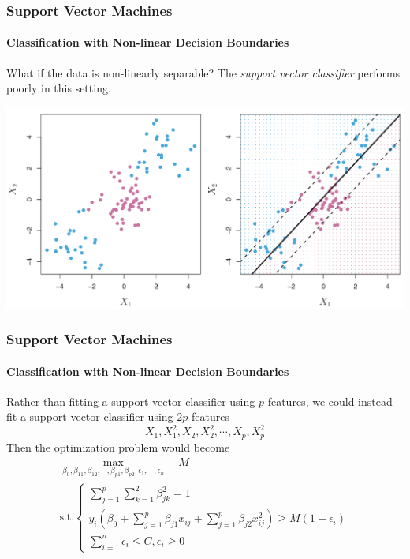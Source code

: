 \documentclass{beamer}
\begin{document}
\begin{frame}
    \frametitle{Support Vector Machines}
    \framesubtitle{Classification with Non-linear Decision Boundaries}
    What if the data is non-linearly separable? The \textit{support vector classifier} 
    performs poorly in this setting.
    \begin{center}
        \includegraphics[scale=0.2]{images/non-linear.png}
    \end{center}
\end{frame}

\begin{frame}
    \frametitle{Support Vector Machines}
    \framesubtitle{Classification with Non-linear Decision Boundaries}
    Rather than fitting a support vector classifier using $p$ features, 
    we could instead fit a support vector classifier using $2p$ features
    \[X_1,X_1^2,X_2,X_2^2,\cdots,X_p,X_p^2 \] 
    Then the optimization problem would become
    \begin{gather*}
        \underset{\beta_0,\beta_{11},\beta_{12},\cdots,\beta_{p1},\beta_{p2},\epsilon_1,\cdots,\epsilon_n}
        {\max} \quad M \quad \\
        \text{s.t.}
        \begin{cases}
            \sum_{j=1}^p\sum_{k=1}^2\beta_{jk}^2=1 \\
            y_i(\beta_0+\sum_{j=1}^{p}\beta_{j1}x_{ij}+\sum_{j=1}^{p}\beta_{j2}x_{ij}^2)\geq M(1-\epsilon_i) \\
            \sum_{i=1}^{n}\epsilon_i\leq C, \epsilon_i \geq 0
        \end{cases}
    \end{gather*}
\end{frame}
\end{document}
